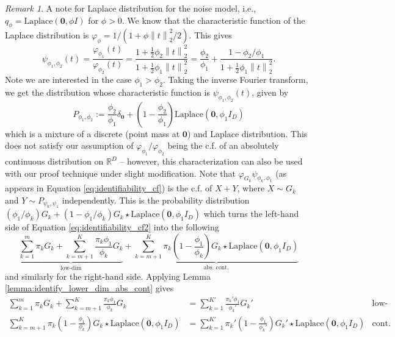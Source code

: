 \documentclass[bj,authoryear]{imsart}
\theoremstyle{plain}
\theoremstyle{remark}
\newtheorem{remark}{Remark}
\def\bbR{\mathbb{R}}
\def\norm#1{\left\|#1\right\|}
\begin{document}
\begin{appendix}
\begin{remark}\label{remark: laplace}
    A note for Laplace distribution for the noise model, i.e., $q_{\phi}=\text{Laplace}(\boldsymbol{0}, \phi I)$ for $\phi>0$. We know that the characteristic function of the Laplace distribution is $\varphi_{\phi}=1/(1+\phi\norm{t}_2^2/2)$. This gives
    $$\psi_{\phi_1,\phi_2}(t)=\frac{\varphi_{\phi_1}(t)}{\varphi_{\phi_2}(t)} = \frac{1 + \frac{1}{2}\phi_2\norm{t}_2^2}{1 + \frac{1}{2}\phi_1\norm{t}_2^2} =\frac{\phi_2}{\phi_1} + \frac{1 - \phi_2/\phi_1}{1+\frac{1}{2}\phi_1\norm{t}_2^2}.$$
    Note we are interested in the case $\phi_1>\phi_2$. Taking the inverse Fourier transform, we get the distribution whose characteristic function is $\psi_{\phi_1,\phi_2}(t)$, given by
    $$P_{\phi_1,\phi_2}:=\frac{\phi_2}{\phi_1} \delta_{\boldsymbol{0}} + \left(1- \frac{\phi_2}{\phi_1}\right)\text{Laplace}(\boldsymbol{0}, \phi_1 I_D)$$
    which is a mixture of a discrete (point mass at $\boldsymbol{0}$) and Laplace distribution. This does not satisfy our assumption of $\varphi_{\phi_1}/\varphi_{\phi_2}$ being the c.f. of an absolutely continuous distribution on $\bbR^D$ -- however, this characterization can also be used with our proof technique under slight modification. Note that $\varphi_{G_k}\psi_{\phi_k,\phi_1}$ (as appears in Equation \eqref{eq:identifiability_cf}) is the c.f. of $X+Y$, where $X\sim G_k$ and $Y\sim P_{\psi_k,\psi_1}$ independently. This is the probability distribution $\left(\phi_1/\phi_k\right) G_k + \left(1 - \phi_1/\phi_k\right) G_k\star \text{Laplace}(\boldsymbol{0}, \phi_1 I_D)$
    which turns the left-hand side of Equation \eqref{eq:identifiability_cf2} into the following
    $$\underbrace{\sum_{k=1}^m \pi_kG_k + \sum_{k=m+1}^K \frac{\pi_k \phi_1}{\phi_k}G_k}_{\text{low-dim}} + \underbrace{\sum_{k=m+1}^K \pi_k\left(1-\frac{\phi_1}{\phi_k}\right)G_k\star \text{Laplace}(\boldsymbol{0}, \phi_1 I_D)}_{\text{abs. cont.}}$$
    and similarly for the right-hand side. Applying Lemma \ref{lemma:identify_lower_dim_abs_cont} gives
    \begin{align*}
    \sum_{k=1}^m \pi_kG_k + \sum_{k=m+1}^K \frac{\pi_k \phi_1}{\phi_k}G_k &= \sum_{k=1}^{K'} \frac{\pi_k'\phi_1}{\phi_{k}'}G_k' &\text{low-dim part}\\
    \sum_{k=m+1}^K  \pi_k\left(1-\frac{\phi_1}{\phi_k}\right)G_k\star \text{Laplace}(\boldsymbol{0}, \phi_1 I_D) &=\sum_{k=1}^{K'}  \pi_k'\left(1-\frac{\phi_1}{\phi_k'}\right)G_k'\star \text{Laplace}(\boldsymbol{0}, \phi_1 I_D) &\text{cont. part}
    \end{align*}

\end{remark}
\end{appendix}
\end{document}
